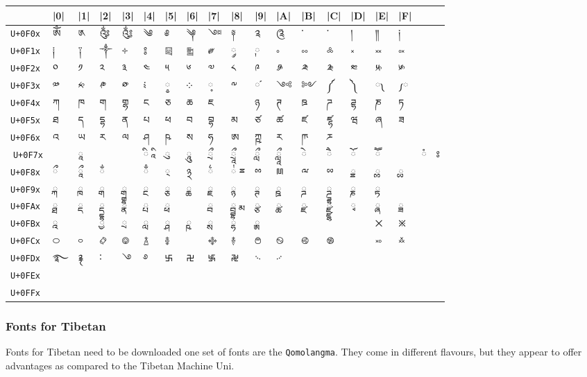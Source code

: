 \bgroup\large
\begin{tabular}{llllllllllllllll l}
\toprule
	           &|0|	&|1|	&|2|	&|3|	&|4|	&|5|	&|6|	&|7|	&|8|	&|9|	&|A|	&|B|	&|C|	&|D|	&|E|	&|F|\\
\midrule
\texttt{U+0F0x}	&ༀ	&༁	&༂	&༃	&༄	&༅	&༆	&༇	&༈	&༉	&༊	&་	&༌  &	།	&༎	&༏\\
\midrule
\texttt{U+0F1x} &༐	&༑	&༒	&༓	&༔	&༕	&༖	&༗	&༘&	༙	&༚	&༛	&༜	&༝	&༞	&༟\\
\midrule
\texttt{U+0F2x} &༠	&༡	&༢	&༣	&༤	&༥	&༦	&༧	&༨	&༩	&༪	&༫	&༬	&༭	&༮	&༯\\
\midrule
\texttt{U+0F3x}	&༰ &༱	 &༲ &༳	&༴ &༵	&༶ & ༷	&༸&	༹	&༺&	༻	&༼&	༽	&༾	&༿\\
\midrule
\texttt{U+0F4x} &ཀ	&ཁ	&ག	&གྷ	&ང	&ཅ	&ཆ	&ཇ	&	&ཉ	&ཊ	&ཋ	&ཌ	&ཌྷ	&ཎ	&ཏ\\
\midrule
\texttt{U+0F5x}	 &ཐ	&ད	&དྷ	&ན	&པ	&ཕ	&བ	&བྷ	&མ	&ཙ	&ཚ	&ཛ	&ཛྷ	&ཝ	&ཞ	&ཟ\\
\midrule
\texttt{U+0F6x} &འ	&ཡ	&ར	&ལ	&ཤ	&ཥ	&ས	&ཧ	&ཨ	&ཀྵ	&ཪ	&ཫ	&ཬ	&&&\\
^^A\texttt{U+0F7x}&&	ཱ &	& &ི	ཱི&	ུ&	ཱུ&	ྲྀ&	ཷ&	ླྀ&	ཹ&	ེ&	ཻ&	ོ&	ཽ&	&ཾ	&ཿ\\
\midrule
\texttt{U+0F8x}&    ྀ   & 	ཱྀ&	ྂ&	&ྃ &	྄	&྅&	྆	&྇	ྈ&	ྉ&	ྊ&	ྋ&	ྌ&	ྍ&	ྎ&	ྏ\\
\midrule
\texttt{U+0F9x} &	ྐ&	ྑ   & 	ྒ &	ྒྷ &	ྔ &	ྕ &	ྖ &	ྗ &		ྙ &	ྚ &	ྛ &	ྜ &	ྜྷ &	ྞ &	ྟ\\
\texttt{U+0FAx} &	ྠ &	ྡ &	ྡྷ &	ྣ &	ྤ &	ྥ &		&ྦ	&ྦྷ	ྨ&	ྩ&	ྪ&	ྫ&	ྫྷ&	ྭ&	ྮ&	ྯ\\
\midrule
\texttt{U+0FBx} 
&	  ྰ 
&	
& ྱ  	 
&ྲ	
&ླ	
&ྴ
&	ྵ
&	ྶ
&	ྷ
&ྸ
&
&
&
&	
&྾	
&྿\\
\midrule
\texttt{U+0FCx}	 &࿀&	࿁&	࿂&	࿃&	࿄&	࿅&	&࿇	&࿈	&࿉	&࿊	&࿋	&࿌	&&	࿎	&࿏\\
\midrule
\texttt{U+0FDx}	&࿐	&࿑	&࿒	&࿓	&࿔	&࿕	&࿖	&࿗	&࿘	&࿙	&࿚	&&&&&\\
\midrule
\texttt{U+0FEx} &&&&&&&&&&&&&&&&\\
\midrule
\texttt{U+0FFx}  &&&&&&&&&&&&&&&&\\
\bottomrule
\end{tabular}
\egroup




\subsubsection{Fonts for Tibetan}

Fonts for Tibetan need to be downloaded one set of fonts are the \texttt{Qomolangma}. They come in different flavours, but they appear
to offer advantages as compared to the Tibetan Machine Uni.
\medskip


